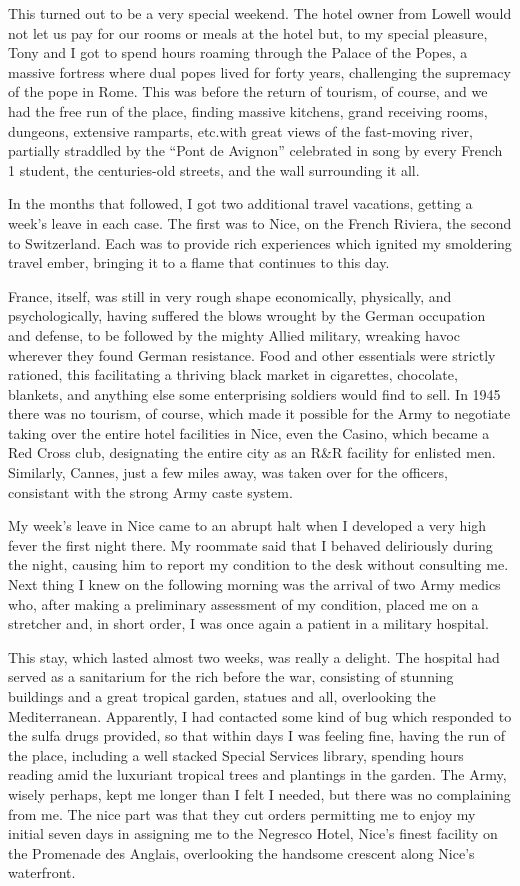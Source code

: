 \documentclass[../m3y]{subfiles}
\begin{document}
This turned out to be a very special weekend. The hotel owner from Lowell would not let us pay for our rooms or meals at the hotel but, to my special pleasure, Tony and I got to spend hours roaming through the Palace of the Popes, a massive fortress where dual popes lived for forty years, challenging the supremacy of the pope in Rome. This was before the return of tourism, of course, and we had the free run of the place, finding massive kitchens, grand receiving rooms, dungeons, extensive ramparts, etc.\@ with great views of the fast-moving river, partially straddled by the ``Pont de Avignon'' celebrated in song by every French 1 student, the centuries-old streets, and the wall surrounding it all.

In the months that followed, I got two additional travel vacations, getting a week's leave in each case. The first was to Nice, on the French Riviera, the second to Switzerland. Each was to provide rich experiences which ignited my smoldering travel ember, bringing it to a flame that continues to this day.

France, itself, was still in very rough shape economically, physically, and psychologically, having suffered the blows wrought by the German occupation and defense, to be followed by the mighty Allied military, wreaking havoc wherever they found German resistance. Food and other essentials were strictly rationed, this facilitating a thriving black market in cigarettes, chocolate, blankets, and anything else some enterprising soldiers would find to sell. In 1945 there was no tourism, of course, which made it possible for the Army to negotiate taking over the entire hotel facilities in Nice, even the Casino, which became a Red Cross club, designating the entire city as an R\&R facility for enlisted men. Similarly, Cannes, just a few miles away, was taken over for the officers, consistant with the strong Army caste system.

My week's leave in Nice came to an abrupt halt when I developed a very high fever the first night there. My roommate said that I behaved deliriously during the night, causing him to report my condition to the desk without consulting me. Next thing I knew on the following morning was the arrival of two Army medics who, after making a preliminary assessment of my condition, placed me on a stretcher and, in short order, I was once again a patient in a military hospital.

This stay, which lasted almost two weeks, was really a delight. The hospital had served as a sanitarium for the rich before the war, consisting of stunning buildings and a great tropical garden, statues and all, overlooking the Mediterranean. Apparently, I had contacted some kind of bug which responded to the sulfa drugs provided, so that within days I was feeling fine, having the run of the place, including a well stacked Special Services library, spending hours reading amid the luxuriant tropical trees and plantings in the garden. The Army, wisely perhaps, kept me longer than I felt I needed, but there was no complaining from me. The nice part was that they cut orders permitting me to enjoy my initial seven days in assigning me to the Negresco Hotel, Nice's finest facility on the Promenade des Anglais, overlooking the handsome crescent along Nice's waterfront.
\end{document}
